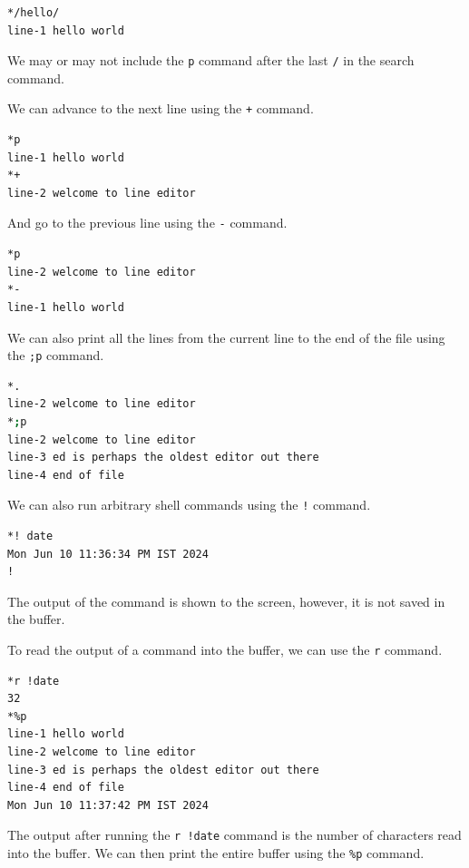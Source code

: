 \begin{lstlisting}[language=bash]
*/hello/
line-1 hello world
\end{lstlisting}

We may or may not include the \lstinline|p| command
after the last \lstinline|/| in the search command.

We can advance to the next line using the \lstinline|+| command.

\begin{lstlisting}[language=bash]
*p
line-1 hello world
*+
line-2 welcome to line editor
\end{lstlisting}

And go to the previous line using the \lstinline|-| command.


\begin{lstlisting}[language=bash]
*p
line-2 welcome to line editor
*-
line-1 hello world
\end{lstlisting}

We can also print all the lines from the current line
to the end of the file using the \lstinline|;p| command.

\begin{lstlisting}[language=bash]
*.
line-2 welcome to line editor
*;p
line-2 welcome to line editor
line-3 ed is perhaps the oldest editor out there
line-4 end of file
\end{lstlisting}

We can also run arbitrary shell commands using the \lstinline|!| command.

\begin{lstlisting}[language=bash]
*! date
Mon Jun 10 11:36:34 PM IST 2024
!
\end{lstlisting}

The output of the command is shown to the screen,
however, it is not saved in the buffer.

To read the output of a command into the buffer,
we can use the \lstinline|r| command.

\begin{lstlisting}[language=bash]
*r !date
32
*%p
line-1 hello world
line-2 welcome to line editor
line-3 ed is perhaps the oldest editor out there
line-4 end of file
Mon Jun 10 11:37:42 PM IST 2024
\end{lstlisting}

The output after running the \lstinline|r !date| command
is the number of characters read into the buffer.
We can then print the entire buffer using the \lstinline|%p| command.

